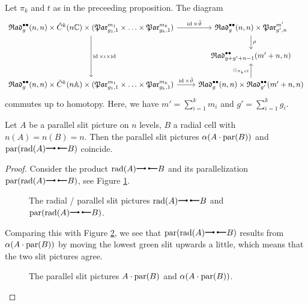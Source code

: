 \begin{cor}
\label{cor_all}
Let $\pi_k$ and $t$ as in the preceeding proposition.
The diagram 
\[
 \begin{tikzcd}
    \Radt^{\bullet \bullet}_{g}(n, n) \times \tilde C^k(n\C) \times (\Part_{g_1, 1}^{m_1} \times \dotsc \times \Part_{g_k, 1}^{m_k}) \arrow{r}{\id \times \tilde \vartheta} \arrow{dd}{\id \times \iota \times \id} & \Radt^{\bullet \bullet}_g(n, n) \times \Part_{g', n}^{m'} \arrow{d}{\rho} \\
																			                                          & \Radt^{\bullet \bullet}_{g + g' + n - 1}(m' + n, n) \\
    \Radt^{\bullet \bullet}_{g}(n, n) \times \tilde C^k(n\A) \times (\Part_{g_1, 1}^{m_1} \times \dotsc \times \Part_{g_k, 1}^{m_k}) \arrow{r}{\id \times \tilde \vartheta}                                         & \Radt^{\bullet \bullet}_g(n, n) \times \Radt^{\bullet \bullet}_{g'}(m' + n, n) \arrow{u}{\odot_{\pi_k \circ t}} 
 \end{tikzcd}
\]   
commutes up to homotopy.
Here, we have $m' = \sum_{i = 1}^k m_i$ and $g' = \sum_{i = 1}^k g_i$.
\end{cor}

\begin{prop}
   Let $A$ be a parallel slit picture on $n$ levels, $B$ a radial cell with $n(A) = n(B) = n$. 
   Then the parallel slit pictures $\alpha (A \cdot \operatorname{par}(B))$ and $\parmap(\radmap(A) \radmult B)$ coincide.
\begin{proof}
   Consider the product $\radmap(A) \radmult B$ and its parallelization $\parmap(\radmap(A) \radmult B)$, see Figure \ref{homology_op:comparison_par_rad_formula_part_1}.
  \begin{figure}[ht]
  \centering
  \caption{\label{homology_op:comparison_par_rad_formula_part_1} The radial / parallel slit pictures $\radmap(A) \radmult B$ and $\parmap(\radmap(A) \radmult B)$.}
  \end{figure}
  Comparing this with Figure \ref{homology_op:comparison_par_rad_formula_part_2},
  we see that $\parmap(\radmap(A) \radmult B)$ results from $\alpha (A \cdot \operatorname{par}(B))$ by moving the lowest green slit upwards a little,
  which means that the two slit pictures agree.
  \begin{figure}[ht]
  \centering
  \caption{\label{homology_op:comparison_par_rad_formula_part_2} The parallel slit pictures $A \cdot \operatorname{par}(B)$ and $\alpha(A \cdot \operatorname{par}(B))$.}
  \end{figure}
\end{proof}
\end{prop}

